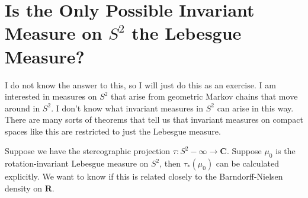 \documentclass{amsart}
\begin{document}
\section{Is the Only Possible Invariant Measure on $S^2$ the Lebesgue Measure?}

I do not know the answer to this, so I will just do this as an exercise.  I am interested in measures on $S^2$ that arise from geometric Markov chains that move around in $S^2$.  I don't know what invariant measures in $S^2$ can arise in this way.  There are many sorts of theorems that tell us that invariant measures on compact spaces like this are restricted to just the Lebesgue measure.  

Suppose we have the stereographic projection $\tau:S^2-{\infty} \rightarrow
\mathbf{C}$.  Suppose $\mu_0$ is the rotation-invariant Lebesgue measure on $S^2$,  then $\tau_*(\mu_0)$ can be calculated explicitly.  We want to know if this is related closely to the Barndorff-Nielsen density on $\mathbf{R}$.
\end{document}
